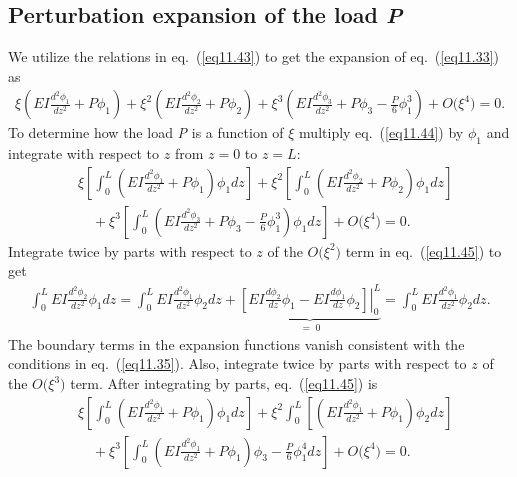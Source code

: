 \documentclass{AeroStructure-ERJohnson}
\begin{document}
\subsection{Perturbation expansion of the load \textit{P}}\label{sec11.2.4}

We utilize the relations in eq.~(\ref{eq11.43}) to get the expansion of eq.~(\ref{eq11.33}) as
\begin{align}
\xi\left(E I \frac{d^{2} \phi_{1}}{d z^{2}}+P \phi_{1}\right)+\xi^{2}\left(E I \frac{d^{2} \phi_{2}}{d z^{2}}+P \phi_{2}\right)+\xi^{3}\left(E I \frac{d^{2} \phi_{3}}{d z^{2}}+P \phi_{3}-\frac{P}{6} \phi_{1}^{3}\right)+O\big(\xi^{4}\big)=0. \label{eq11.44}
\end{align}
To determine how the load \textit{P} is a function of $\xi$ multiply eq.~(\ref{eq11.44}) by $\phi_{1}$ and integrate with respect to $z$ from $z=0$ to $z=L$:
\begin{align}
&\xi\left[\int_{0}^{L}\left(E I \frac{d^{2} \phi_{1}}{d z^{2}}+P \phi_{1}\right) \phi_{1} d z\right]+\xi^{2}\left[\int_{0}^{L}\left(E I \frac{d^{2} \phi_{2}}{d z^{2}}+P \phi_{2}\right) \phi_{1} d z\right]\nonumber\\
&\quad+\xi^{3}\left[\int_{0}^{L}\left(E I \frac{d^{2} \phi_{3}}{d z^{2}}+P \phi_{3}-\frac{P}{6} \phi_{1}^{3}\right) \phi_{1} d z\right]  +O\big(\xi^{4}\big)=0. \label{eq11.45}
\end{align}
Integrate twice by parts with respect to $z$ of the $ O\big(\xi^{2}\big)$ term in eq.~(\ref{eq11.45}) to get
\begin{align}
\int_{0}^{L} E I \frac{d^{2} \phi_{2}}{dz^{2}} \phi_{1} d z=\int_{0}^{L} E I \frac{d^{2} \phi_{1}}{dz^{2}} \phi_{2} d z+\underbrace{\left.\left[E I \frac{d \phi_{2}}{d z} \phi_{1}-E I \frac{d \phi_{1}}{d z} \phi_{2}\right]\right|_{0} ^{L}}_{=\;0}=\int_{0}^{L} E I \frac{d^{2} \phi_{1}}{dz^{2}} \phi_{2} d z. \label{eq11.46}
\end{align}
The boundary terms in the expansion functions vanish consistent with the conditions in eq.~(\ref{eq11.35}). Also, integrate twice by parts with respect to $z$ of the $ O\big(\xi^{3}\big) $ term. After integrating by parts, eq.~(\ref{eq11.45}) is
\begin{align}
&\xi\left[\int_{0}^{L}\left(E I \frac{d^{2} \phi_{1}}{d z^{2}}+P \phi_{1}\right) \phi_{1} d z\right]+\xi^{2} \int_{0}^{L}\left[\left(E I \frac{d^{2} \phi_{1}}{d z^{2}}+P \phi_{1}\right) \phi_{2} d z\right]\nonumber\\
&\quad+\xi^{3}\left[\int_{0}^{L}\left(E I \frac{d^{2} \phi_{1}}{d z^{2}}+P \phi_{1}\right) \phi_{3}-\frac{P}{6} \phi_{1}^{4} d z\right]  +O\big(\xi^{4}\big)=0. \label{eq11.47}
\end{align}
\end{document}
